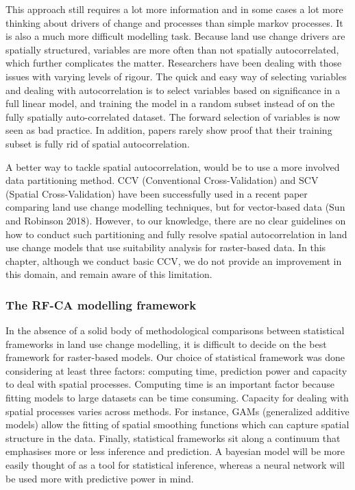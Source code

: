 This approach still requires a lot more information and in some cases a lot more thinking about drivers of change and processes than simple markov processes. It is also a much more difficult modelling task. Because land use change drivers are spatially structured, variables are more often than not spatially autocorrelated, which further complicates the matter. Researchers have been dealing with those issues with varying levels of rigour. The quick and easy way of selecting variables and dealing with autocorrelation is to select variables based on significance in a full linear model, and training the model in a random subset instead of on the fully spatially auto-correlated dataset. The forward selection of variables is now seen as bad practice. In addition, papers rarely show proof that their training subset is fully rid of spatial autocorrelation.

A better way to tackle spatial autocorrelation, would be to use a more involved data partitioning method. CCV (Conventional Cross-Validation) and SCV (Spatial Cross-Validation) have been successfully used in a recent paper comparing land use change modelling techniques, but for vector-based data (Sun and Robinson 2018). However, to our knowledge, there are no clear guidelines on how to conduct such partitioning and fully resolve spatial autocorrelation in land use change models that use suitability analysis for raster-based data. In this chapter, although we conduct basic CCV, we do not provide an improvement in this domain, and remain aware of this limitation.\\

\subsubsection{The RF-CA modelling framework}

In the absence of a solid body of methodological comparisons between statistical frameworks in land use change modelling, it is difficult to decide on the best framework for raster-based models. Our choice of statistical framework was done considering at least three factors: computing time, prediction power and capacity to deal with spatial processes. Computing time is an important factor because fitting models to large datasets can be time consuming. Capacity for dealing with spatial processes varies across methods. For instance, GAMs (generalized additive models) allow the fitting of spatial smoothing functions which can capture spatial structure in the data. Finally, statistical frameworks sit along a continuum that emphasises more or less inference and prediction. A bayesian model will be more easily thought of as a tool for statistical inference, whereas a neural network will be used more with predictive power in mind.

